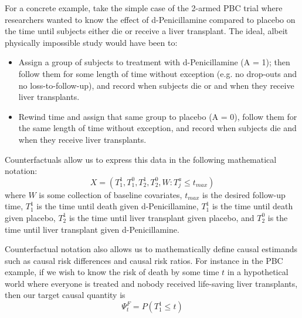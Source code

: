 \documentclass{report}
\newcommand{\1}{\ensuremath{\mathbf{1}}}
\renewcommand{\L}{\ensuremath{W}}
\begin{document}
For a concrete example, take the simple case of the 2-armed PBC trial where researchers wanted to know the effect of d-Penicillamine compared to placebo on the time until subjects either die or receive a liver transplant. The ideal, albeit physically impossible study would have been to:
\begin{itemize}
\item Assign a group of subjects to treatment with d-Penicillamine (A = 1); then follow them for some length of time without exception (e.g. no drop-outs and no loss-to-follow-up), and record when subjects die or and when they receive liver transplants.
\item Rewind time and assign that same group to placebo (A = 0), follow them for the same length of time without exception, and record when subjects die and when they receive liver transplants.
\end{itemize}

Counterfactuals allow us to express this data in the following mathematical notation:
\[ X = (T^1_1, T^0_1, T^1_2, T^0_2, \L : T^a_j \leq t_{max}) \]
where \(\L\) is some collection of baseline covariates, \(t_{max}\) is the desired follow-up time, \(T^1_1\) is the time until death given d-Penicillamine, \(T^1_1\) is the time until death given placebo, \(T^1_2\) is the time until liver transplant given placebo, and \(T^0_2\) is the time until liver transplant given d-Penicillamine.

Counterfactual notation also allows us to mathematically define causal estimands such as causal risk differences and causal risk ratios. For instance in the PBC example, if we wish to know the risk of death by some time \(t\) in a hypothetical world where everyone is treated and nobody received life-saving liver transplants, then our target causal quantity is
\begin{equation}
 \Psi^F_t = P(T^1_1 \leq t) \label{survcausalestimand}
\end{equation}
\end{document}
